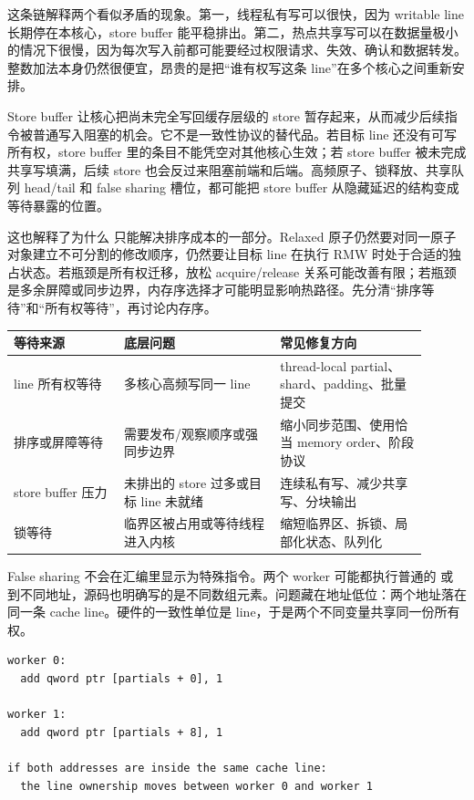 这条链解释两个看似矛盾的现象。第一，线程私有写可以很快，因为 writable line 长期停在本核心，store buffer 能平稳排出。第二，热点共享写可以在数据量极小的情况下很慢，因为每次写入前都可能要经过权限请求、失效、确认和数据转发。整数加法本身仍然很便宜，昂贵的是把“谁有权写这条 line”在多个核心之间重新安排。

Store buffer 让核心把尚未完全写回缓存层级的 store 暂存起来，从而减少后续指令被普通写入阻塞的机会。它不是一致性协议的替代品。若目标 line 还没有可写所有权，store buffer 里的条目不能凭空对其他核心生效；若 store buffer 被未完成共享写填满，后续 store 也会反过来阻塞前端和后端。高频原子、锁释放、共享队列 head/tail 和 false sharing 槽位，都可能把 store buffer 从隐藏延迟的结构变成等待暴露的位置。

这也解释了为什么  只能解决排序成本的一部分。Relaxed 原子仍然要对同一原子对象建立不可分割的修改顺序，仍然要让目标 line 在执行 RMW 时处于合适的独占状态。若瓶颈是所有权迁移，放松 acquire/release 关系可能改善有限；若瓶颈是多余屏障或同步边界，内存序选择才可能明显影响热路径。先分清“排序等待”和“所有权等待”，再讨论内存序。

\begin{center}
\small
\begin{tabular}{@{}p{0.24\linewidth}p{0.34\linewidth}p{0.32\linewidth}@{}}
\toprule
等待来源 & 底层问题 & 常见修复方向 \\
\midrule
line 所有权等待 & 多核心高频写同一 line & thread-local partial、shard、padding、批量提交 \\
排序或屏障等待 & 需要发布/观察顺序或强同步边界 & 缩小同步范围、使用恰当 memory order、阶段协议 \\
store buffer 压力 & 未排出的 store 过多或目标 line 未就绪 & 连续私有写、减少共享写、分块输出 \\
锁等待 & 临界区被占用或等待线程进入内核 & 缩短临界区、拆锁、局部化状态、队列化 \\
\bottomrule
\end{tabular}
\end{center}

False sharing 不会在汇编里显示为特殊指令。两个 worker 可能都执行普通的  或  到不同地址，源码也明确写的是不同数组元素。问题藏在地址低位：两个地址落在同一条 cache line。硬件的一致性单位是 line，于是两个不同变量共享同一份所有权。

\begin{lstlisting}[numbers=none,caption={两个独立槽位仍可能落在同一条 line}]
worker 0:
  add qword ptr [partials + 0], 1

worker 1:
  add qword ptr [partials + 8], 1

if both addresses are inside the same cache line:
  the line ownership moves between worker 0 and worker 1
\end{lstlisting}

